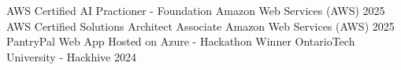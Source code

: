 

\begin{cvhonors}

  \cvhonor
  {AWS Certified AI Practioner - Foundation} %
  {Amazon Web Services (AWS)} %
  {} %
  {2025} %
  \cvhonor
  {AWS Certified Solutions Architect Associate} %
  {Amazon Web Services (AWS)} %
  {} %
  {2025} %
  \cvhonor
  {PantryPal Web App Hosted on Azure - Hackathon Winner} %
  {OntarioTech University - Hackhive} %
  {} %
  {2024} %
\end{cvhonors}
